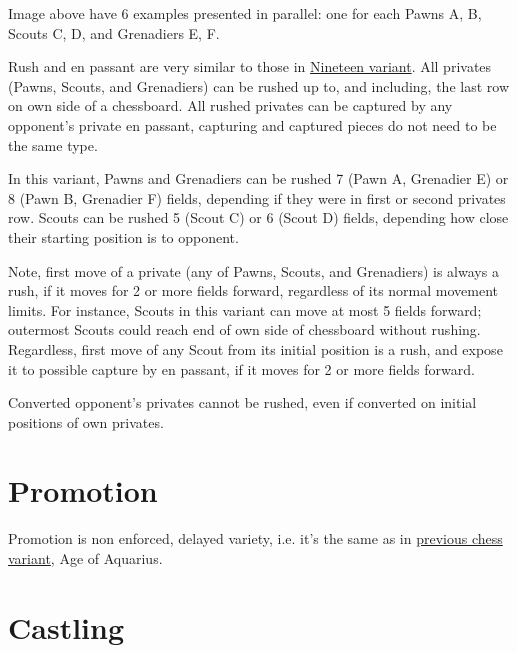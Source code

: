 \vspace*{-0.5\baselineskip}
Image above have 6 examples presented in parallel: one for each Pawns A, B,
Scouts C, D, and Grenadiers E, F.

Rush and en passant are very similar to those in
\hyperref[fig:12_nineteen_en_passant]{Nineteen variant}.
All privates (Pawns, Scouts, and Grenadiers) can be rushed up to, and including,
the last row on own side of a chessboard. All rushed privates can be captured by
any opponent's private en passant, capturing and captured pieces do not need to
be the same type.

In this variant, Pawns and Grenadiers can be rushed 7 (Pawn A, Grenadier E) or 8
(Pawn B, Grenadier F) fields, depending if they were in first or second privates
row. Scouts can be rushed 5 (Scout C) or 6 (Scout D) fields, depending how close
their starting position is to opponent.

Note, first move of a private (any of Pawns, Scouts, and Grenadiers) is always a
rush, if it moves for 2 or more fields forward, regardless of its normal movement
limits.\newline
\indent
For instance, Scouts in this variant can move at most 5 fields forward; outermost
Scouts could reach end of own side of chessboard without rushing. Regardless, first
move of any Scout from its initial position is a rush, and expose it to possible
capture by en passant, if it moves for 2 or more fields forward.

Converted opponent's privates cannot be rushed, even if converted on initial
positions of own privates.

\clearpage %

\section*{Promotion}
\label{sec:Hemera's Dawn/Promotion}

Promotion is non enforced, delayed variety, i.e. it's the same as in
\hyperref[sec:Age of Aquarius/Promotion]{previous chess variant}, Age of Aquarius.


\section*{Castling}
\label{sec:Hemera's Dawn/Castling}

